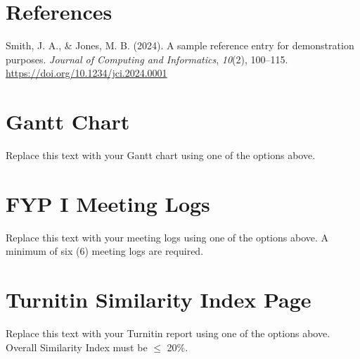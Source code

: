 \documentclass[
]{fypStandard}
\newlength{\cslhangindent}
\newenvironment{CSLReferences}[2] %
 {\begin{list}{}{%
  \setlength{\itemindent}{0pt}
  \setlength{\leftmargin}{0pt}
  \setlength{\parsep}{0pt}
  \ifodd #1
   \setlength{\leftmargin}{\cslhangindent}
   \setlength{\itemindent}{-1\cslhangindent}
  \fi
  \setlength{\itemsep}{#2\baselineskip}}}
 {\end{list}}
\begin{document}
\chapter*{References}\label{references}

\label{refs}
\begin{CSLReferences}{1}{0}
Smith, J. A., \& Jones, M. B. (2024). A sample reference entry for
demonstration purposes. \emph{Journal of Computing and Informatics},
\emph{10}(2), 100--115. \url{https://doi.org/10.1234/jci.2024.0001}

\end{CSLReferences}

\newpage
\appendix

\chapter*{Gantt Chart}\label{gantt-chart}


Replace this text with your Gantt chart using one of the options above.

\newpage

\chapter*{FYP I Meeting Logs}\label{fyp-i-meeting-logs}


Replace this text with your meeting logs using one of the options above.
A minimum of six (6) meeting logs are required.

\newpage

\chapter*{Turnitin Similarity Index
Page}\label{turnitin-similarity-index-page}


Replace this text with your Turnitin report using one of the options
above. Overall Similarity Index must be \(\leq\) 20\%.
\end{document}
